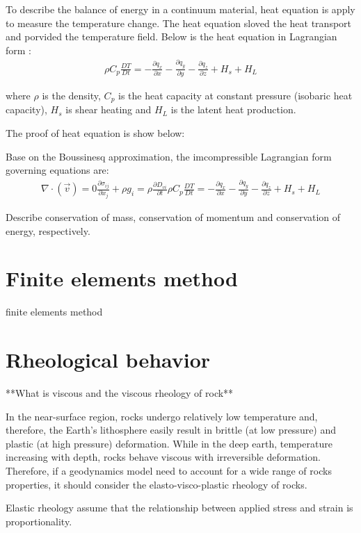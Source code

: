 To describe the balance of energy in a continuum material, heat equation is apply to measure the temperature change. The heat equation sloved the heat transport and porvided the temperature field. Below is the heat equation in Lagrangian form :
\begin{align}
\rho C_p \frac{DT}{Dt} = -\frac{\partial q_x}{\partial x}-\frac{\partial q_y}{\partial y}-\frac{\partial q_z}{\partial z}+H_s+H_L
\end{align}

where $\rho$ is the density, $C_p$ is the heat capacity at constant pressure (isobaric heat capacity), $H_s$ is shear heating and $H_L$ is the latent heat production.

The proof of heat equation is show below:

Base on the Boussinesq approximation, the imcompressible Lagrangian form governing equations are:
\begin{align}
\nabla \cdot (\vec v) = 0 
\frac{\partial \sigma_{ij}}{\partial x_j}+\rho g_i = \rho \frac{\partial D_{vi}}{\partial t}
\rho C_p \frac{DT}{Dt} = -\frac{\partial q_x}{\partial x}-\frac{\partial q_y}{\partial y}-\frac{\partial q_z}{\partial z}+H_s+H_L
\end{align}

Describe conservation of mass, conservation of momentum and conservation of energy, respectively.


\section{Finite elements method}

finite elements method

\section{Rheological behavior}

**What is viscous and the viscous rheology of rock**

In the near-surface region, rocks undergo relatively low temperature and, therefore, the Earth's lithosphere easily result in brittle (at low pressure) and plastic (at high pressure) deformation. 
While in the deep earth, temperature increasing with depth, rocks behave viscous with irreversible deformation. 
Therefore, if a geodynamics model need to account for a wide range of rocks properties, it should consider the elasto-visco-plastic rheology of rocks.

Elastic rheology assume that the relationship between applied stress and strain is proportionality. 

